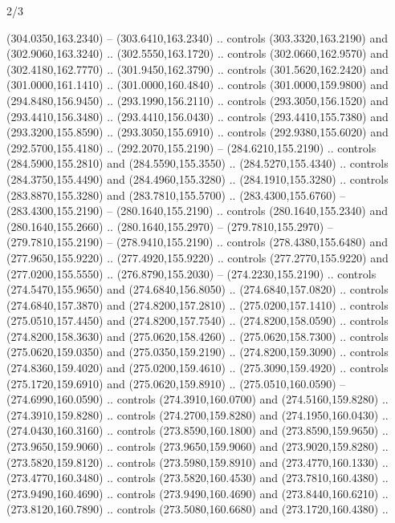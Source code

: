 \begin{flagdescription}{2/3}
\begin{scope}[xshift=0.5\flaglength,yshift=0.5\flagwidth,scale=\flagwidth/259.2]
\begin{scope}[y=0.8pt, x=0.8pt, yscale=-1,shift={(-243,-162)}]
      (304.0350,163.2340) -- (303.6410,163.2340) .. controls (303.3320,163.2190) and
      (302.9060,163.3240) .. (302.5550,163.1720) .. controls (302.0660,162.9570) and
      (302.4180,162.7770) .. (301.9450,162.3790) .. controls (301.5620,162.2420) and
      (301.0000,161.1410) .. (301.0000,160.4840) .. controls (301.0000,159.9800) and
      (294.8480,156.9450) .. (293.1990,156.2110) .. controls (293.3050,156.1520) and
      (293.4410,156.3480) .. (293.4410,156.0430) .. controls (293.4410,155.7380) and
      (293.3200,155.8590) .. (293.3050,155.6910) .. controls (292.9380,155.6020) and
      (292.5700,155.4180) .. (292.2070,155.2190) -- (284.6210,155.2190) .. controls
      (284.5900,155.2810) and (284.5590,155.3550) .. (284.5270,155.4340) .. controls
      (284.3750,155.4490) and (284.4960,155.3280) .. (284.1910,155.3280) .. controls
      (283.8870,155.3280) and (283.7810,155.5700) .. (283.4300,155.6760) --
      (283.4300,155.2190) -- (280.1640,155.2190) .. controls (280.1640,155.2340) and
      (280.1640,155.2660) .. (280.1640,155.2970) -- (279.7810,155.2970) --
      (279.7810,155.2190) -- (278.9410,155.2190) .. controls (278.4380,155.6480) and
      (277.9650,155.9220) .. (277.4920,155.9220) .. controls (277.2770,155.9220) and
      (277.0200,155.5550) .. (276.8790,155.2030) -- (274.2230,155.2190) .. controls
      (274.5470,155.9650) and (274.6840,156.8050) .. (274.6840,157.0820) .. controls
      (274.6840,157.3870) and (274.8200,157.2810) .. (275.0200,157.1410) .. controls
      (275.0510,157.4450) and (274.8200,157.7540) .. (274.8200,158.0590) .. controls
      (274.8200,158.3630) and (275.0620,158.4260) .. (275.0620,158.7300) .. controls
      (275.0620,159.0350) and (275.0350,159.2190) .. (274.8200,159.3090) .. controls
      (274.8360,159.4020) and (275.0200,159.4610) .. (275.3090,159.4920) .. controls
      (275.1720,159.6910) and (275.0620,159.8910) .. (275.0510,160.0590) --
      (274.6990,160.0590) .. controls (274.3910,160.0700) and (274.5160,159.8280) ..
      (274.3910,159.8280) .. controls (274.2700,159.8280) and (274.1950,160.0430) ..
      (274.0430,160.3160) .. controls (273.8590,160.1800) and (273.8590,159.9650) ..
      (273.9650,159.9060) .. controls (273.9650,159.9060) and (273.9020,159.8280) ..
      (273.5820,159.8120) .. controls (273.5980,159.8910) and (273.4770,160.1330) ..
      (273.4770,160.3480) .. controls (273.5820,160.4530) and (273.7810,160.4380) ..
      (273.9490,160.4690) .. controls (273.9490,160.4690) and (273.8440,160.6210) ..
      (273.8120,160.7890) .. controls (273.5080,160.6680) and (273.1720,160.4380) ..

\end{scope}
\end{scope}
\end{flagdescription}
